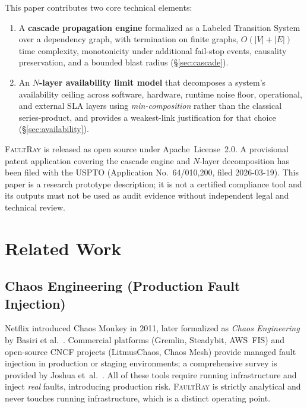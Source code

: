 \documentclass[10pt,twocolumn]{article}
\begin{document}
\noindent
This paper contributes two core technical elements:

\begin{enumerate}[nosep]
\item A \textbf{cascade propagation engine} formalized as a Labeled
  Transition System over a dependency graph, with termination
  on finite graphs, $O(|V| + |E|)$ time complexity,
  monotonicity under additional fail-stop events, causality
  preservation, and a bounded blast radius
  (\S\ref{sec:cascade}).
\item An \textbf{$N$-layer availability limit model} that decomposes
  a system's availability ceiling across software, hardware,
  runtime noise floor, operational, and external SLA layers using
  \emph{min-composition} rather than the classical series-product,
  and provides a weakest-link justification for that choice
  (\S\ref{sec:availability}).
\end{enumerate}

\textsc{FaultRay} is released as open source under Apache~License~2.0.
A provisional patent application covering the cascade engine and
$N$-layer decomposition has been filed with the USPTO (Application
No.~64/010,200, filed 2026-03-19). This paper is a research
prototype description; it is not a certified compliance tool and
its outputs must not be used as audit evidence without independent
legal and technical review.

\section{Related Work}\label{sec:related}

\subsection{Chaos Engineering (Production Fault Injection)}
Netflix introduced Chaos Monkey in 2011, later formalized as
\emph{Chaos Engineering} by Basiri et al.~\cite{basiri2016}.
Commercial platforms (Gremlin, Steadybit, AWS~FIS) and open-source
CNCF projects (LitmusChaos, Chaos Mesh) provide managed fault
injection in production or staging environments; a comprehensive
survey is provided by Joshua et~al.~\cite{chaos-mlr-2025}.
All of these tools require running
infrastructure and inject \emph{real} faults, introducing production
risk. \textsc{FaultRay} is strictly analytical and never touches
running infrastructure, which is a distinct operating point.
\end{document}
